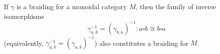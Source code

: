 If $\gamma$ is a braiding for a monoidal category $M$, then the family of inverse isomorphisms
$$\gamma^{-1}_{a,b} = (\gamma_{b,a})^{-1} : a \square b \cong b \square a$$
(equivalently, $\gamma^{-1}_{a,b} = (\gamma_{a,b})^{-1}$) also constitutes a braiding for $M$.
